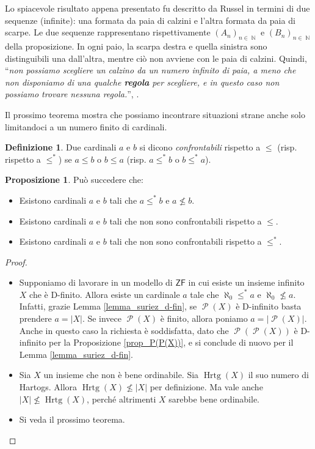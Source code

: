 \documentclass[12pt,a4paper]{report}
\theoremstyle{definition}
\newtheorem{defn}[teo]{Definizione}  %
\newtheorem{prop}[teo]{Proposizione}  %
\theoremstyle{num.custom-title}
\DeclareMathOperator{\PP}{\mathcal{P}}
\DeclareMathOperator{\Hrtg}{\text{Hrtg}}
\DeclareMathOperator{\N}{\mathbb{N}}
\newcommand{\ZF}{\ensuremath{\mathsf{ZF}}\xspace}
\begin{document}
Lo spiacevole risultato appena presentato fu descritto da Russel in termini di due sequenze (infinite): una formata da paia di calzini e l'altra formata da paia di scarpe. Le due sequenze rappresentano rispettivamente $(A_n)_{n \in \N}$ e $(B_n)_{n \in \N}$ della proposizione. In ogni paio, la scarpa destra e quella sinistra sono distinguibili una dall'altra, mentre ciò non avviene con le paia di calzini. Quindi, ``\emph{non possiamo scegliere un calzino da un numero infinito di paia, a meno che non disponiamo di una qualche \textbf{regola} per scegliere, e in questo caso non possiamo trovare nessuna regola.}'', \cite{Rus07:Herrlich}.

Il prossimo teorema mostra che possiamo incontrare situazioni strane anche solo limitandoci a un numero finito di cardinali.

\begin{defn}
Due cardinali $a$ e $b$ si dicono \emph{confrontabili} rispetto a $\leq$ (risp. rispetto a $\leq^*$) se $a \leq b$ o $b \leq a$ (risp. $a \leq^* b$ o $b \leq^* a$).
\end{defn}

\begin{prop}
Può succedere che:
\begin{itemize}
\item[(1)] Esistono cardinali $a$ e $b$ tali che $a \leq^* b$ e $a \not\leq b$.
\item[(2)] Esistono cardinali $a$ e $b$ tali che non sono confrontabili rispetto a $\leq$.
\item[(3)] Esistono cardinali $a$ e $b$ tali che non sono confrontabili rispetto a $\leq^*$.
\end{itemize}
\begin{proof}\ 
\begin{itemize}
\item[(1)] Supponiamo di lavorare in un modello di \ZF in cui esiste un insieme infinito $X$ che è D-finito. Allora esiste un cardinale $a$ tale che $\aleph_0 \leq^* a$ e $\aleph_0 \not\leq a$. Infatti, grazie Lemma \ref{lemma_suriez_d-fin}, se $\PP(X)$ è D-infinito basta prendere $a=|X|$. Se invece $\PP(X)$ è finito, allora poniamo $a=|\PP(X)|$. Anche in questo caso la richiesta è soddisfatta, dato che $\PP(\PP(X))$ è D-infinito per la Proposizione \ref{prop_P(P(X))}, e si conclude di nuovo per il Lemma \ref{lemma_suriez_d-fin}.
\item[(2)] Sia $X$ un insieme che non è bene ordinabile. Sia $\Hrtg(X)$ il suo numero di Hartogs. Allora $\Hrtg(X) \not\leq |X|$ per definizione. Ma vale anche $|X| \not\leq \Hrtg(X)$, perché altrimenti $X$ sarebbe bene ordinabile.
\item[(3)] Si veda il prossimo teorema.
\end{itemize}
\end{proof}
\end{prop}
\end{document}
